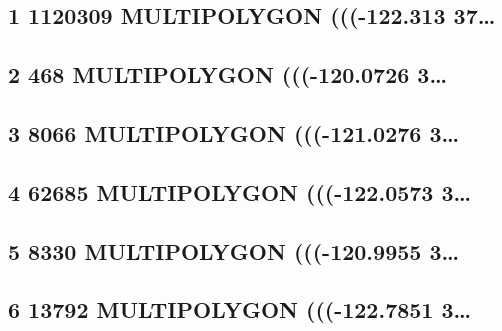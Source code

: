 \documentclass[
  12pt,
]{article}
\begin{document}
\hypertarget{multipolygon--122.313-37}{%
\subsection{1 1120309 MULTIPOLYGON (((-122.313
37\ldots{}}\label{multipolygon--122.313-37}}

\hypertarget{multipolygon--120.0726-3}{%
\subsection{2 468 MULTIPOLYGON (((-120.0726
3\ldots{}}\label{multipolygon--120.0726-3}}

\hypertarget{multipolygon--121.0276-3}{%
\subsection{3 8066 MULTIPOLYGON (((-121.0276
3\ldots{}}\label{multipolygon--121.0276-3}}

\hypertarget{multipolygon--122.0573-3}{%
\subsection{4 62685 MULTIPOLYGON (((-122.0573
3\ldots{}}\label{multipolygon--122.0573-3}}

\hypertarget{multipolygon--120.9955-3}{%
\subsection{5 8330 MULTIPOLYGON (((-120.9955
3\ldots{}}\label{multipolygon--120.9955-3}}

\hypertarget{multipolygon--122.7851-3}{%
\subsection{6 13792 MULTIPOLYGON (((-122.7851
3\ldots{}}\label{multipolygon--122.7851-3}}
\end{document}
